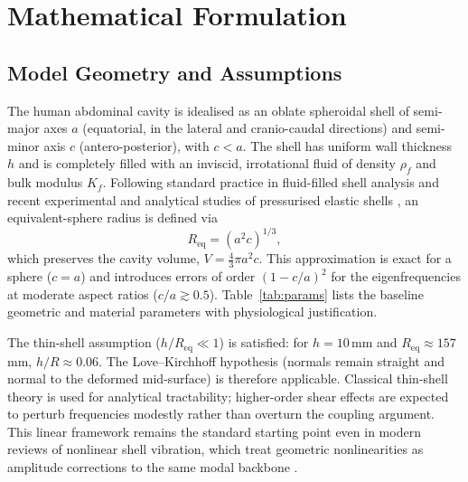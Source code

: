 \section{Mathematical Formulation}\label{sec:formulation}

\subsection{Model Geometry and Assumptions}\label{sec:geometry}

The human abdominal cavity is idealised as an oblate spheroidal shell of
semi-major axes $a$ (equatorial, in the lateral and cranio-caudal directions)
and semi-minor axis $c$ (antero-posterior), with $c < a$.  The shell has uniform
wall thickness $h$ and is completely filled with an inviscid, irrotational
fluid of density $\rho_f$ and bulk modulus $K_f$.  Following standard practice
in fluid-filled shell analysis \cite{Junger1986,lamb1882} and recent
experimental and analytical studies of pressurised elastic shells
\cite{Kuo2015,Ghaheri2022}, an
equivalent-sphere radius is defined via
\begin{equation}\label{eq:Req}
  R_\mathrm{eq} = (a^2 c)^{1/3},
\end{equation}
which preserves the cavity volume, $V = \tfrac{4}{3}\pi a^2 c$.  This
approximation is exact for a sphere ($c = a$) and introduces errors of order
$(1 - c/a)^2$ for the eigenfrequencies at moderate aspect ratios ($c/a \gtrsim
0.5$).  Table~\ref{tab:params} lists the baseline geometric and material
parameters with physiological justification.

The thin-shell assumption ($h/R_\mathrm{eq} \ll 1$) is satisfied: for
$h = 10$\,mm and $R_\mathrm{eq} \approx 157$\,mm, $h/R \approx 0.06$.  The
Love--Kirchhoff hypothesis \cite{Love1927} (normals remain straight and normal to the
deformed mid-surface) is therefore applicable.  Classical thin-shell theory is
used for analytical tractability; higher-order shear effects are expected to
perturb frequencies modestly rather than overturn the coupling argument.
This linear framework remains
the standard starting point even in modern reviews of nonlinear shell
vibration, which treat geometric nonlinearities as amplitude corrections to
the same modal backbone \cite{Alijani2014}.

